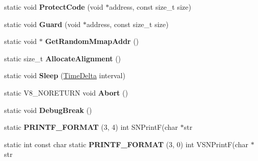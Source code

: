 \begin{DoxyCompactItemize}
\item 
static void {\bfseries Protect\+Code} (void $\ast$address, const size\+\_\+t size)\hypertarget{classv8_1_1base_1_1_o_s_ac845f794a302e78ed7bf8ab2e39c9407}{}\label{classv8_1_1base_1_1_o_s_ac845f794a302e78ed7bf8ab2e39c9407}

\item 
static void {\bfseries Guard} (void $\ast$address, const size\+\_\+t size)\hypertarget{classv8_1_1base_1_1_o_s_a5d824361aac41a7d41846f16e423df61}{}\label{classv8_1_1base_1_1_o_s_a5d824361aac41a7d41846f16e423df61}

\item 
static void $\ast$ {\bfseries Get\+Random\+Mmap\+Addr} ()\hypertarget{classv8_1_1base_1_1_o_s_a0dd812385ed06989631ba4146d2b649b}{}\label{classv8_1_1base_1_1_o_s_a0dd812385ed06989631ba4146d2b649b}

\item 
static size\+\_\+t {\bfseries Allocate\+Alignment} ()\hypertarget{classv8_1_1base_1_1_o_s_a124b7fa9d499f97b3742bb64b76e9995}{}\label{classv8_1_1base_1_1_o_s_a124b7fa9d499f97b3742bb64b76e9995}

\item 
static void {\bfseries Sleep} (\hyperlink{classv8_1_1base_1_1_time_delta}{Time\+Delta} interval)\hypertarget{classv8_1_1base_1_1_o_s_a04656670e0be067dfe2a93bd2c809b7c}{}\label{classv8_1_1base_1_1_o_s_a04656670e0be067dfe2a93bd2c809b7c}

\item 
static V8\+\_\+\+N\+O\+R\+E\+T\+U\+RN void {\bfseries Abort} ()\hypertarget{classv8_1_1base_1_1_o_s_a3abddefa2e7ad8ab0628e6b44fad5a6b}{}\label{classv8_1_1base_1_1_o_s_a3abddefa2e7ad8ab0628e6b44fad5a6b}

\item 
static void {\bfseries Debug\+Break} ()\hypertarget{classv8_1_1base_1_1_o_s_affd1b5cd2e2a82058f49432ffc5236e6}{}\label{classv8_1_1base_1_1_o_s_affd1b5cd2e2a82058f49432ffc5236e6}

\item 
static {\bfseries P\+R\+I\+N\+T\+F\+\_\+\+F\+O\+R\+M\+AT} (3, 4) int S\+N\+PrintF(char $\ast$str\hypertarget{classv8_1_1base_1_1_o_s_ab13f2ea1271ff3fb5ce240414f5a86f6}{}\label{classv8_1_1base_1_1_o_s_ab13f2ea1271ff3fb5ce240414f5a86f6}

\item 
static int const char static {\bfseries P\+R\+I\+N\+T\+F\+\_\+\+F\+O\+R\+M\+AT} (3, 0) int V\+S\+N\+PrintF(char $\ast$str\hypertarget{classv8_1_1base_1_1_o_s_a7707c6d4774957b773ff8ee046912ffa}{}\label{classv8_1_1base_1_1_o_s_a7707c6d4774957b773ff8ee046912ffa}


\end{DoxyCompactItemize}
